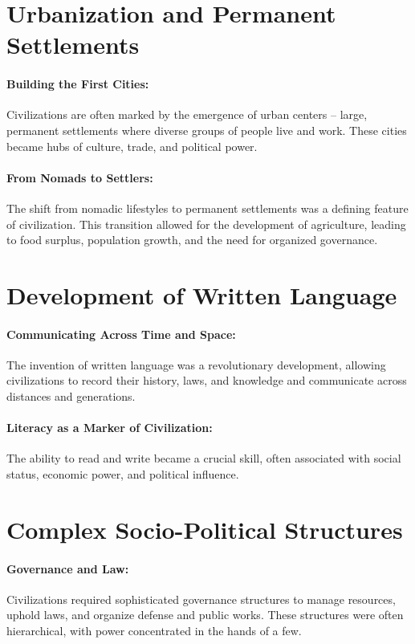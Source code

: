 \documentclass[a4paper,12pt]{book}
\begin{document}
\section*{Urbanization and Permanent Settlements}

\paragraph{Building the First Cities:}
Civilizations are often marked by the emergence of urban centers – large, permanent settlements where diverse groups of people live and work. These cities became hubs of culture, trade, and political power.

\paragraph{From Nomads to Settlers:}
The shift from nomadic lifestyles to permanent settlements was a defining feature of civilization. This transition allowed for the development of agriculture, leading to food surplus, population growth, and the need for organized governance.

\section*{Development of Written Language}

\paragraph{Communicating Across Time and Space:}
The invention of written language was a revolutionary development, allowing civilizations to record their history, laws, and knowledge and communicate across distances and generations.

\paragraph{Literacy as a Marker of Civilization:}
The ability to read and write became a crucial skill, often associated with social status, economic power, and political influence.

\section*{Complex Socio-Political Structures}

\paragraph{Governance and Law:}
Civilizations required sophisticated governance structures to manage resources, uphold laws, and organize defense and public works. These structures were often hierarchical, with power concentrated in the hands of a few.
\end{document}
